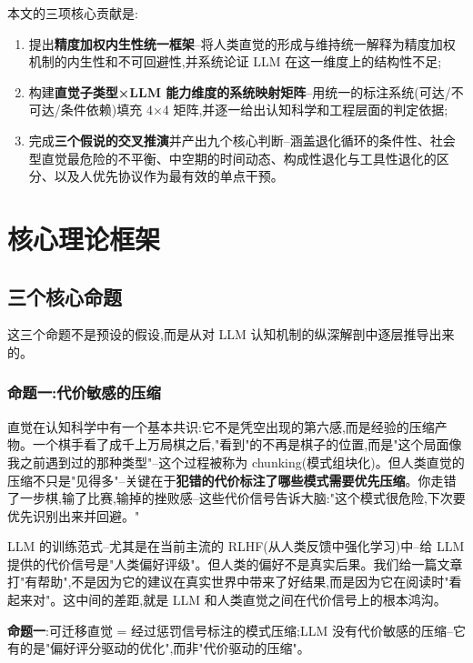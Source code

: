 \documentclass[11pt,a4paper]{article}
\begin{document}
本文的三项核心贡献是:

\begin{enumerate}[label=(\arabic*)]
  \item 提出\textbf{精度加权内生性统一框架}--将人类直觉的形成与维持统一解释为精度加权机制的内生性和不可回避性,并系统论证 LLM 在这一维度上的结构性不足;
  \item 构建\textbf{直觉子类型×LLM 能力维度的系统映射矩阵}--用统一的标注系统(可达/不可达/条件依赖)填充 4×4 矩阵,并逐一给出认知科学和工程层面的判定依据;
  \item 完成\textbf{三个假说的交叉推演}并产出九个核心判断--涵盖退化循环的条件性、社会型直觉最危险的不平衡、中空期的时间动态、构成性退化与工具性退化的区分、以及人优先协议作为最有效的单点干预。
\end{enumerate}

\section{核心理论框架}

\subsection{三个核心命题}

这三个命题不是预设的假设,而是从对 LLM 认知机制的纵深解剖中逐层推导出来的。

\subsubsection{命题一:代价敏感的压缩}

直觉在认知科学中有一个基本共识:它不是凭空出现的第六感,而是经验的压缩产物。一个棋手看了成千上万局棋之后,"看到"的不再是棋子的位置,而是"这个局面像我之前遇到过的那种类型"--这个过程被称为 chunking(模式组块化)\cite{chase1973perception}。但人类直觉的压缩不只是"见得多"--关键在于\textbf{犯错的代价标注了哪些模式需要优先压缩}。你走错了一步棋,输了比赛,输掉的挫败感--这些代价信号告诉大脑:"这个模式很危险,下次要优先识别出来并回避。"

LLM 的训练范式--尤其是在当前主流的 RLHF(从人类反馈中强化学习)中--给 LLM 提供的代价信号是"人类偏好评级"。但人类的偏好不是真实后果。我们给一篇文章打"有帮助",不是因为它的建议在真实世界中带来了好结果,而是因为它在阅读时"看起来对"。这中间的差距,就是 LLM 和人类直觉之间在代价信号上的根本鸿沟。

\textbf{命题一}:可迁移直觉 = 经过惩罚信号标注的模式压缩;LLM 没有代价敏感的压缩--它有的是"偏好评分驱动的优化",而非"代价驱动的压缩"。
\end{document}
